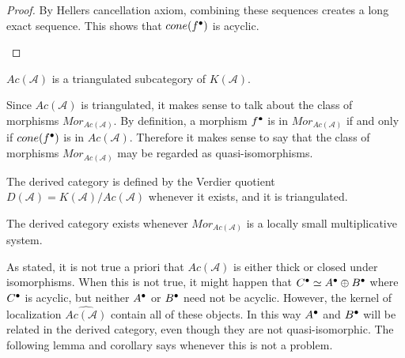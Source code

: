 \begin{proof}
        By Hellers cancellation axiom, combining these sequences creates a long exact sequence. This shows that $cone(f^{\bullet})$ is acyclic.
        \begin{center}
        \end{center}
    \end{proof}

    \begin{corollary}
        $Ac(\mathcal{A})$ is a triangulated subcategory of $K(\mathcal{A})$.
    \end{corollary}

    Since $Ac(\mathcal{A})$ is triangulated, it makes sense to talk about the class of morphisms $Mor_{Ac(\mathcal{A})}$. By definition, a morphism $f^{\bullet}$ is in $Mor_{Ac(\mathcal{A})}$ if and only if $cone(f^{\bullet})$ is in $Ac(\mathcal{A})$. Therefore it makes sense to say that the class of morphisms $Mor_{Ac(\mathcal{A})}$ may be regarded as quasi-isomorphisms. 

    \begin{corollary}
        The derived category is defined by the Verdier quotient $D(\mathcal{A})=K(\mathcal{A})/Ac(\mathcal{A})$ whenever it exists, and it is triangulated.
    \end{corollary}

    \begin{remark}
        The derived category exists whenever $Mor_{Ac(\mathcal{A})}$ is a locally small multiplicative system.
    \end{remark}

    As stated, it is not true a priori that $Ac(\mathcal{A})$ is either thick or closed under isomorphisms. When this is not true, it might happen that $C^{\bullet}\simeq A^{\bullet}\oplus B^{\bullet}$ where $C^{\bullet}$ is acyclic, but neither $A^{\bullet}$ or $B^{\bullet}$ need not be acyclic. However, the kernel of localization $\widehat{Ac(\mathcal{A})}$ contain all of these objects. In this way $A^{\bullet}$ and $B^{\bullet}$ will be related in the derived category, even though they are not quasi-isomorphic. The following lemma and corollary says whenever this is not a problem.

